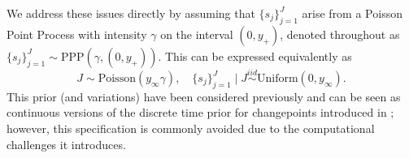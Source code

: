 \documentclass[ba,preprint]{imsart}
\theoremstyle{plain}
\theoremstyle{definition}
\theoremstyle{remark}
\begin{document}
We address these issues directly by assuming that $\{s_j\}_{j=1}^J$ arise from a Poisson Point Process with intensity $\gamma$ on the interval $(0,y_+)$, denoted throughout as $\{s_j\}_{j=1}^J \sim \text{PPP}(\gamma, (0,y_+))$. This can be expressed equivalently as
{\color{red}\begin{equation}
    \label{eq;PPP}
    J \sim \text{Poisson}(y_\infty\gamma), \quad \{s_j\}_{j=1}^J\mid J \overset{iid}{\sim} \text{Uniform}(0,y_\infty).
\end{equation}}
This prior (and variations) have been considered previously \citep{Chapple2020, Demarqui2012} {\color{red} and can be seen as continuous versions of the discrete time prior for changepoints introduced in \cite{fearnhead2006}}; however, this specification is commonly avoided due to the computational challenges it introduces. 
\end{document}
